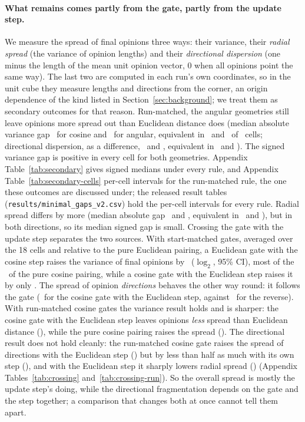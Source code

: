 \documentclass[11pt]{article}
\begin{document}
\paragraph{What remains comes partly from the gate, partly from the update step.}
We measure the spread of final opinions three ways: their variance, their \emph{radial spread} (the variance of opinion lengths) and their \emph{directional dispersion} (one minus the length of the mean unit opinion vector, 0 when all opinions point the same way). The last two are computed in each run's own coordinates, so in the unit cube they measure lengths and directions from the corner, an origin dependence of the kind listed in Section~\ref{sec:background}; we treat them as secondary outcomes for that reason.
Run-matched, the angular geometries still leave opinions more spread out than Euclidean distance does (median absolute variance gap \VRunVarGapCos\ for cosine and \VRunVarGapAng\ for angular, equivalent in \VRunVarEquivCos\ and \VRunVarEquivAng\ of \VCellsPerGeom\ cells; directional dispersion, as a difference, \VRunDispGapCos\ and \VRunDispGapAng, equivalent in \VRunDispEquivCos\ and \VRunDispEquivAng).
The signed variance gap is positive in every cell for both geometries.
Appendix Table~\ref{tab:secondary} gives signed medians under every rule, and Appendix Table~\ref{tab:secondary-cells} per-cell intervals for the run-matched rule, the one these outcomes are discussed under; the released result tables (\texttt{results/minimal\_gaps\_v2.csv}) hold the per-cell intervals for every rule.
Radial spread differs by more (median absolute gap \VRunRadialGapCos\ and \VRunRadialGapAng, equivalent in \VRunRadialEquivCos\ and \VRunRadialEquivAng), but in both directions, so its median signed gap is small.
Crossing the gate with the update step separates the two sources.
With start-matched gates, averaged over the 18 cells and relative to the pure Euclidean pairing, a Euclidean gate with the cosine step raises the variance of final opinions by \VXEucCosVar\ ($\log_2$, 95\% CI), most of the \VXCosCosVar\ of the pure cosine pairing, while a cosine gate with the Euclidean step raises it by only \VXCosEucVar.
The spread of opinion \emph{directions} behaves the other way round: it follows the gate (\VXCosEucDisp\ for the cosine gate with the Euclidean step, against \VXEucCosDisp\ for the reverse).
With run-matched cosine gates the variance result holds and is sharper: the cosine gate with the Euclidean step leaves opinions \emph{less} spread than Euclidean distance (\VXRCosEucVar), while the pure cosine pairing raises the spread (\VXRCosCosVar).
The directional result does not hold cleanly: the run-matched cosine gate raises the spread of directions with the Euclidean step (\VXRCosEucDisp) but by less than half as much with its own step (\VXRCosCosDisp), and with the Euclidean step it sharply lowers radial spread (\VXRCosEucRadial) (Appendix Tables~\ref{tab:crossing} and~\ref{tab:crossing-run}).
So the overall spread is mostly the update step's doing, while the directional fragmentation depends on the gate and the step together; a comparison that changes both at once cannot tell them apart.
\end{document}
